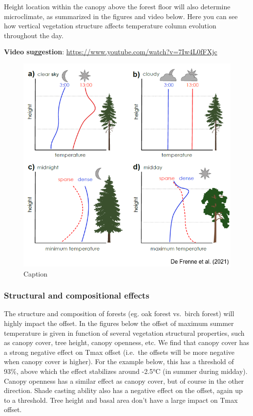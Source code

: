 \documentclass[12pt,oneside]{book}
\begin{document}
Height location within the canopy above the forest floor will also
determine microclimate, as summarized in the figures and video below.
Here you can see how vertical vegetation structure affects temperature
column evolution throughout the day.

\textbf{Video suggestion}:
\url{https://www.youtube.com/watch?v=7Iw4L0fFXjc}

\begin{figure}

{\centering \includegraphics[width=0.8\linewidth]{figures/Figure1016} 

}

\caption{Caption}\label{fig:Micro16}
\end{figure}

\subsubsection{Structural and compositional
effects}\label{structural-and-compositional-effects}

The structure and composition of forests (eg. oak forest vs.~birch
forest) will highly impact the offset. In the figures below the offset
of maximum summer temperature is given in function of several vegetation
structural properties, such as canopy cover, tree height, canopy
openness, etc. We find that canopy cover has a strong negative effect on
Tmax offset (i.e.~the offsets will be more negative when canopy cover is
higher). For the example below, this has a threshold of 93\%, above
which the effect stabilizes around -2.5°C (in summer during midday).
Canopy openness has a similar effect as canopy cover, but of course in
the other direction. Shade casting ability also has a negative effect on
the offset, again up to a threshold. Tree height and basal area don't
have a large impact on Tmax offset.
\end{document}
